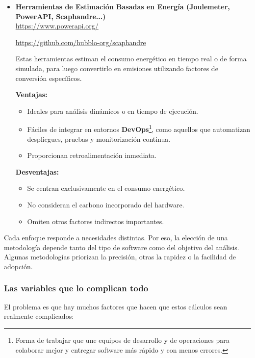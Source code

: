 \documentclass[12pt,a4paper]{report}
\begin{document}
\begin{itemize}
        \vspace{0.8em}

  \item \textbf{Herramientas de Estimación Basadas en Energía (Joulemeter, PowerAPI, Scaphandre...)} \\
        \href{https://www.powerapi.org/}{https://www.powerapi.org/}

        \href{https://github.com/hubblo-org/scaphandre}{https://github.com/hubblo-org/scaphandre}

        Estas herramientas estiman el consumo energético en tiempo real o de forma simulada, para luego convertirlo en emisiones utilizando factores de conversión específicos.

        \textbf{Ventajas:}
        \begin{itemize}
          \item Ideales para análisis dinámicos o en tiempo de ejecución.
          \item Fáciles de integrar en entornos \textbf{DevOps}\footnote{Forma de trabajar que une equipos de desarrollo y de operaciones para colaborar mejor y entregar software más rápido y con menos errores.}, como aquellos que automatizan despliegues, pruebas y monitorización continua.
          \item Proporcionan retroalimentación inmediata.
        \end{itemize}
        \textbf{Desventajas:}
        \begin{itemize}
          \item Se centran exclusivamente en el consumo energético.
          \item No consideran el carbono incorporado del hardware.
          \item Omiten otros factores indirectos importantes.
        \end{itemize}
\end{itemize}

Cada enfoque responde a necesidades distintas. Por eso, la elección de una metodología depende tanto del tipo de software como del objetivo del análisis. Algunas metodologías priorizan la precisión, otras la rapidez o la facilidad de adopción.

\subsubsection{Las variables que lo complican todo}

El problema es que hay muchos factores que hacen que estos cálculos sean realmente complicados:
\end{document}
